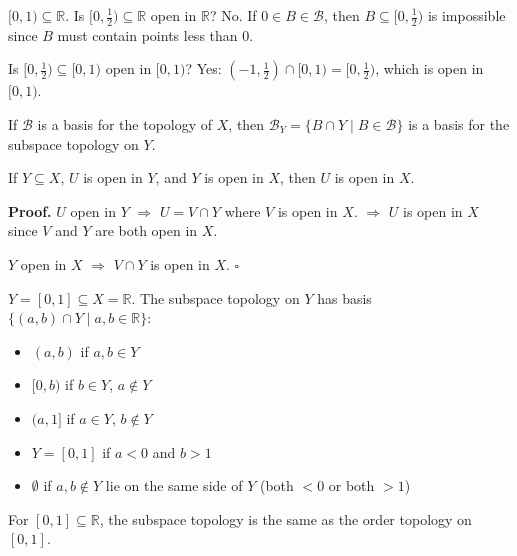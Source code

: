 \documentclass[11pt]{report}
\renewenvironment{proof}[1][Proof]{\noindent\textbf{#1.} }{\hfill$\square$\par\vspace{5pt}}
\begin{document}
\begin{exbox}
$[0,1) \subseteq \mathbb{R}$. Is $[0, \frac{1}{2}) \subseteq \mathbb{R}$ open in $\mathbb{R}$? No. If $0 \in B \in \mathcal{B}$, then $B \subseteq [0, \frac{1}{2})$ is impossible since $B$ must contain points less than $0$.

Is $[0, \frac{1}{2}) \subseteq [0,1)$ open in $[0,1)$? Yes: $(-1, \frac{1}{2}) \cap [0,1) = [0, \frac{1}{2})$, which is open in $[0,1)$.
\end{exbox}

\begin{lembox}
If $\mathcal{B}$ is a basis for the topology of $X$, then $\mathcal{B}_Y = \{B \cap Y \mid B \in \mathcal{B}\}$ is a basis for the subspace topology on $Y$.
\end{lembox}

\begin{lembox}
If $Y \subseteq X$, $U$ is open in $Y$, and $Y$ is open in $X$, then $U$ is open in $X$.
\end{lembox}

\begin{proof}
$U$ open in $Y$ $\Rightarrow$ $U = V \cap Y$ where $V$ is open in $X$. $\Rightarrow$ $U$ is open in $X$ since $V$ and $Y$ are both open in $X$.

$Y$ open in $X$ $\Rightarrow$ $V \cap Y$ is open in $X$.
\end{proof}

\begin{exbox}
$Y = [0,1] \subseteq X = \mathbb{R}$. The subspace topology on $Y$ has basis $\{(a,b) \cap Y \mid a, b \in \mathbb{R}\}$:
\begin{itemize}
    \item $(a,b)$ if $a, b \in Y$
    \item $[0, b)$ if $b \in Y$, $a \notin Y$
    \item $(a, 1]$ if $a \in Y$, $b \notin Y$
    \item $Y = [0,1]$ if $a < 0$ and $b > 1$
    \item $\emptyset$ if $a, b \notin Y$ lie on the same side of $Y$ (both $< 0$ or both $> 1$)
\end{itemize}
For $[0,1] \subseteq \mathbb{R}$, the subspace topology is the same as the order topology on $[0,1]$.
\end{exbox}
\end{document}
